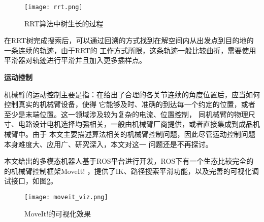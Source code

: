 \begin{figure}[h] %
  \centering
  \texttt{[image: rrt.png]}
  \caption{RRT算法中树生长的过程\cite{kuffner2000rrt}}
  \label{fig:rrt}
\end{figure}

在RRT树完成搜索后，可以通过回溯的方式找到在解空间内从出发点到目的地的一条连续的轨迹，由于RRT的
工作方式所限，这条轨迹一般比较曲折，需要使用平滑器对轨迹进行平滑并且加入更多插样点。

\noindent \textbf{运动控制}

机械臂的运动控制主要是指：在给出了合理的各关节连续的角度位置后，应当如何控制真实的机械臂设备，使得
它能够及时、准确的到达每一个约定的位置，或者至少是末端位置。这一领域涉及较为复杂的电流、位置控制，
同机械臂的物理尺寸、电路设计电机选择均强相关，一般由机械臂厂商提供，或者直接集成到成品机械臂中。由于
本文主要描述算法相关的机械臂控制问题，因此尽管运动控制问题本身难度大、应用广、研究深入，本文对这一
问题还是不再探讨。


本文给出的多模态机器人基于ROS平台进行开发，ROS下有一个生态比较完全的的机械臂控制框架MoveIt!\citep{chitta2012moveit}
，提供了IK、路径搜索平滑功能，以及完善的可视化调试接口，如图\ref{fig:moveit_viz}。

\begin{figure}[h] %
  \centering
  \texttt{[image: moveit\_viz.png]}
  \caption{MoveIt!的可视化效果}
  \label{fig:moveit_viz}
\end{figure}


























